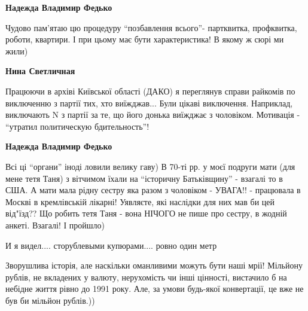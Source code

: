 \begin{itemize}
\begin{itemize}
\begin{itemize}
\textbf{Надежда Владимир Федько} 

Чудово пам'ятаю цю процедуру \enquote{позбавлення всього}- партквитка, профквитка,
роботи, квартири. І при цьому має бути характеристика! В якому ж сюрі ми жили)

\textbf{Нина Светличная} 

Працюючи в архіві Київської області (ДАКО) я переглянув справи райкомів по
виключенню з партії тих, хто виїжджав... Були цікаві виключення. Наприклад,
виключають N з партії за те, що його донька виїжджає з чоловіком. Мотивація -
\enquote{утратил политическую бдительность}!


\textbf{Надежда Владимир Федько} 

Всі ці \enquote{органи} іноді ловили велику гаву) В 70-ті рр. у моєї подруги мати (для
мене тетя Таня) з вітчимом їхали на \enquote{історичну Батьківщину} - взагалі то в США.
А мати мала рідну сестру яка разом з чоловіком - УВАГА!! - працювала в Москві в
кремлівській лікарні! Уявляєте, які наслідки для них мав би цей від"їзд?? Що
робить тетя Таня - вона НІЧОГО не пише про сестру, в жодній анкеті. Взагалі! І
пройшло)

\end{itemize} %

\end{itemize} %

И я видел.... сторублевыми купюрами.... ровно один метр


Зворушлива історія, але наскільки оманливими можуть бути наші мрії! Мільйону
рублів, не вкладених у валюту, нерухомість чи інші цінності, вистачило б на
небідне життя рівно до 1991 року. Але, за умови будь-якої конвертації, це вже
не був би мільйон рублів.))

\end{itemize} %
